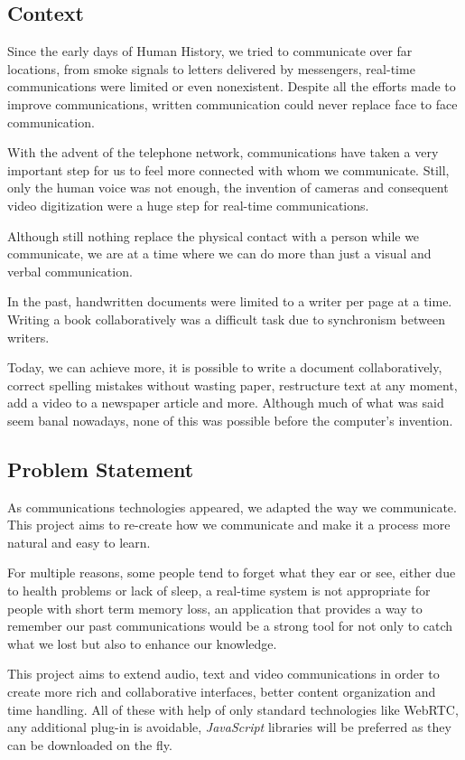 \subsection{Context}   %
 	Since the early days of Human History, we tried to communicate over far locations, from smoke signals to letters delivered by messengers, real-time communications were limited or even nonexistent. Despite all the efforts made to improve communications, written communication could never replace face to face communication.

	With the advent of the telephone network, communications have taken a very important step for us to feel more connected with whom we communicate. Still, only the human voice was not enough, the invention of cameras and consequent video digitization were a huge step for real-time communications.

 	Although still nothing replace the physical contact with a person while we communicate, we are at a time where we can do more than just a visual and verbal communication.
 	
	In the past, handwritten documents were limited to a writer per page at a time. Writing a book collaboratively was a difficult task due to synchronism between writers.

	Today, we can achieve more, it is possible to write a document collaboratively, correct spelling mistakes without wasting paper, restructure text at any moment, add a video to a newspaper article and more. Although much of what was said seem banal nowadays, none of this was possible before the computer's invention. 

\subsection{Problem Statement} %

	As communications technologies appeared, we adapted the way we communicate. This project aims to re-create how we communicate and make it a process more natural and easy to learn. 

	For multiple reasons, some people tend to forget what they ear or see, either due to health problems or lack of sleep, a real-time system is not appropriate for people with short term memory loss, an application that provides a way to remember our past communications would be a strong tool for not only to catch what we lost but also to enhance our knowledge.

	This project aims to extend audio, text and video communications in order to create more rich and collaborative interfaces, better content organization and time handling. All of these with help of only standard technologies like \ac{WebRTC}, any additional plug-in is avoidable, \emph{JavaScript} libraries will be preferred as they can be downloaded on the fly.  

